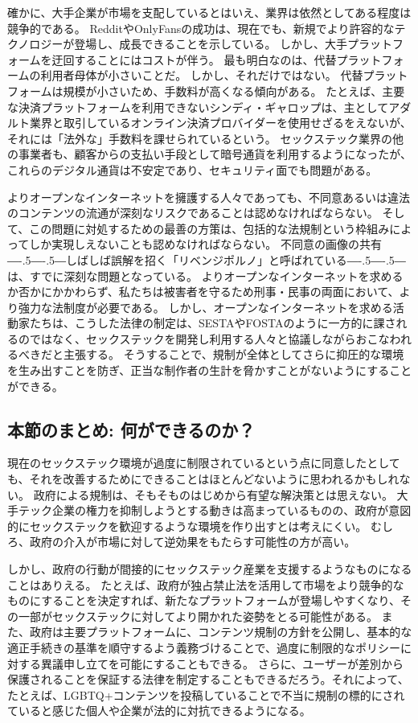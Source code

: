 \documentclass[paper=a4,book,openany]{jlreq}
\def\DDASH{―\kern-.5\zw―\kern-.5\zw―} %
\begin{document}
確かに、大手企業が市場を支配しているとはいえ、業界は依然としてある程度は競争的である。
RedditやOnlyFansの成功は、現在でも、新規でより許容的なテクノロジーが登場し、成長できることを示している。
しかし、大手プラットフォームを迂回することにはコストが伴う。
最も明白なのは、代替プラットフォームの利用者母体が小さいことだ。
しかし、それだけではない。
代替プラットフォームは規模が小さいため、手数料が高くなる傾向がある。
たとえば、主要な決済プラットフォームを利用できないシンディ・ギャロップは、主としてアダルト業界と取引しているオンライン決済プロバイダーを使用せざるをえないが、それには「法外な」手数料を課せられているという。
セックステック業界の他の事業者も、顧客からの支払い手段として暗号通貨を利用するようになったが、これらのデジタル通貨は不安定であり、セキュリティ面でも問題がある。

よりオープンなインターネットを擁護する人々であっても、不同意あるいは違法のコンテンツの流通が深刻なリスクであることは認めなければならない。
そして、この問題に対処するための最善の方策は、包括的な法規制という枠組みによってしか実現しえないことも認めなければならない。
不同意の画像の共有{\DDASH}しばしば誤解を招く「リベンジポルノ」と呼ばれている{\DDASH}は、すでに深刻な問題となっている。
よりオープンなインターネットを求めるか否かにかかわらず、私たちは被害者を守るため刑事・民事の両面において、より強力な法制度が必要である\citep{kibbe20:_faceb_has_banned_ads_kink}。
しかし、オープンなインターネットを求める活動家たちは、こうした法律の制定は、SESTAやFOSTAのように一方的に課されるのではなく、セックステックを開発し利用する人々と協議しながらおこなわれるべきだと主張する。
そうすることで、規制が全体としてさらに抑圧的な環境を生み出すことを防ぎ、正当な制作者の生計を脅かすことがないようにすることができる。

\subsection{本節のまとめ: 何ができるのか？}

現在のセックステック環境が過度に制限されているという点に同意したとしても、それを改善するためにできることはほとんどないように思われるかもしれない。
政府による規制は、そもそものはじめから有望な解決策とは思えない。
大手テック企業の権力を抑制しようとする動きは高まっているものの、政府が意図的にセックステックを歓迎するような環境を作り出すとは考えにくい。
むしろ、政府の介入が市場に対して逆効果をもたらす可能性の方が高い。

しかし、政府の行動が間接的にセックステック産業を支援するようなものになることはありえる。
たとえば、政府が独占禁止法を活用して市場をより競争的なものにすることを決定すれば、新たなプラットフォームが登場しやすくなり、その一部がセックステックに対してより開かれた姿勢をとる可能性がある。
また、政府は主要プラットフォームに、コンテンツ規制の方針を公開し、基本的な適正手続きの基準を順守するよう義務づけることで、過度に制限的なポリシーに対する異議申し立てを可能にすることもできる。
さらに、ユーザーが差別から保護されることを保証する法律を制定することもできるだろう。それによって、たとえば、LGBTQ+コンテンツを投稿していることで不当に規制の標的にされていると感じた個人や企業が法的に対抗できるようになる。
\end{document}
